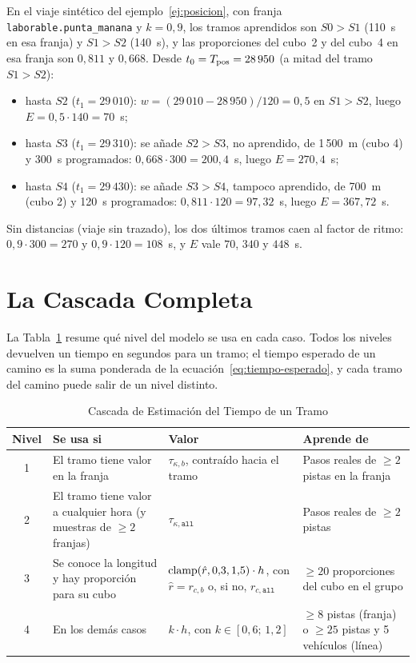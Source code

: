 \begin{ejemplo}
\label{ej:tiempo-esperado}
En el viaje sintético del ejemplo~\ref{ej:posicion}, con franja \texttt{laborable.punta\_manana} y $k=0{,}9$, los
tramos aprendidos son $S0{>}S1$ (110~s en esa franja) y $S1{>}S2$ (140~s), y las proporciones del cubo~2 y del cubo~4
en esa franja son $0{,}811$ y $0{,}668$. Desde $t_0=T_{\mathrm{pos}}=28\,950$ (a mitad del tramo $S1{>}S2$):
\begin{itemize}
  \item hasta $S2$ ($t_1=29\,010$): $w=(29\,010-28\,950)/120=0{,}5$ en $S1{>}S2$, luego $E=0{,}5\cdot140=70$~s;
  \item hasta $S3$ ($t_1=29\,310$): se añade $S2{>}S3$, no aprendido, de 1\,500~m (cubo 4) y 300~s programados:
        $0{,}668\cdot300=200{,}4$~s, luego $E=270{,}4$~s;
  \item hasta $S4$ ($t_1=29\,430$): se añade $S3{>}S4$, tampoco aprendido, de 700~m (cubo 2) y 120~s programados:
        $0{,}811\cdot120=97{,}32$~s, luego $E=367{,}72$~s.
\end{itemize}
Sin distancias (viaje sin trazado), los dos últimos tramos caen al factor de ritmo: $0{,}9\cdot300=270$ y
$0{,}9\cdot120=108$~s, y $E$ vale $70$, $340$ y $448$~s.
\end{ejemplo}

\section{La Cascada Completa}
\label{sec:cascada}

La Tabla~\ref{tab:cascada} resume qué nivel del modelo se usa en cada caso. Todos los niveles devuelven un tiempo en
segundos para un tramo; el tiempo esperado de un camino es la suma ponderada de la
ecuación~\eqref{eq:tiempo-esperado}, y cada tramo del camino puede salir de un nivel distinto.

\begin{table}[ht]
\centering
\caption{Cascada de Estimación del Tiempo de un Tramo}\label{tab:cascada}
\begin{tabularx}{\textwidth}{@{}c>{\raggedright\arraybackslash}X>{\raggedright\arraybackslash}X>{\raggedright\arraybackslash}X@{}}
\toprule
Nivel & Se usa si & Valor & Aprende de\\
\midrule
1 & El tramo tiene valor en la franja & $\tau_{\kappa,b}$, contraído hacia el tramo & Pasos reales de $\ge2$ pistas en la franja\\
2 & El tramo tiene valor a cualquier hora (y muestras de $\ge2$ franjas) & $\tau_{\kappa,\texttt{all}}$ & Pasos reales de $\ge2$ pistas\\
3 & Se conoce la longitud y hay proporción para su cubo & $\operatorname{clamp}(\hat r,0{,}3,1{,}5)\cdot h$, con $\hat r=r_{c,b}$ o, si no, $r_{c,\texttt{all}}$ & $\ge20$ proporciones del cubo en el grupo\\
4 & En los demás casos & $k\cdot h$, con $k\in[0{,}6;\,1{,}2]$ & $\ge8$ pistas (franja) o $\ge25$ pistas y 5 vehículos (línea)\\
\bottomrule
\end{tabularx}
\end{table}

